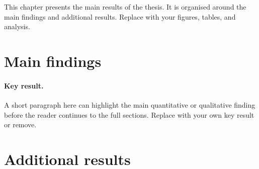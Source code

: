 %

This chapter presents the main results of the thesis. It is organised around the main findings and additional results. Replace with your figures, tables, and analysis.

\lipsum[23-24]

\section{Main findings}\label{sec:results-main}

\lipsum[25-27]

\paragraph{Key result.} A short paragraph here can highlight the main quantitative or qualitative finding before the reader continues to the full sections. Replace with your own key result or remove.

\section{Additional results}\label{sec:results-additional}

\lipsum[28-30]
